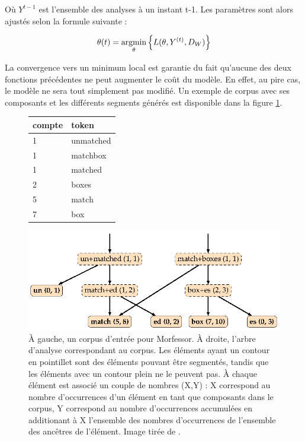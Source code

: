 \documentclass[PhD-Yoann-Dupont.tex]{subfiles}
\begin{document}
Où $Y^{t-1}$ est l'ensemble des analyses à un instant t-1. Les paramètres sont alors ajustés selon la formule suivante :

\begin{equation}
\theta(t) = \underset{\theta}{\operatorname{argmin}} \left \{ L(\theta, Y^{(t)}, D_{W}) \right \}
\end{equation}

La convergence vers un minimum local est garantie du fait qu'aucune des deux fonctions précédentes ne peut augmenter le coût du modèle. En effet, au pire cas, le modèle ne sera tout simplement pas modifié. Un exemple de corpus avec ses composants et les différents segments générés est disponible dans la figure \ref{fig:morfessor-tree}.

\begin{figure}[ht!]
\begin{minipage}{0.33\linewidth}
    \centering
    \begin{tabular}{|l|l|}
    \hline
    compte & token \\
    \hline
    1      & unmatched \\
    1      & matchbox \\
    1      & matched \\
    2      & boxes \\
    5      & match \\
    7      & box \\
    \hline
    \end{tabular}
\end{minipage}
\begin{minipage}{0.66\linewidth}
    \centering
    \includegraphics[scale=1.0]{images/morfessor/morfessor-tree}
\end{minipage}
\caption{À gauche, un corpus d'entrée pour Morfessor. À droite, l'arbre d'analyse correspondant au corpus. Les éléments ayant un contour en pointillet sont des éléments pouvant être segmentés, tandis que les éléments avec un contour plein ne le peuvent pas. À chaque élément est associé un couple de nombres (X,Y) : X correspond au nombre d'occurrences d'un élément en tant que composants dans le corpus, Y correspond au nombre d'occurrences accumulées en additionant à X l'ensemble des nombres d'occurrences de l'ensemble des ancêtres de l'élément. Image tirée de \citet{virpioja2013morfessor}.}
\label{fig:morfessor-tree}
\end{figure}
\end{document}
